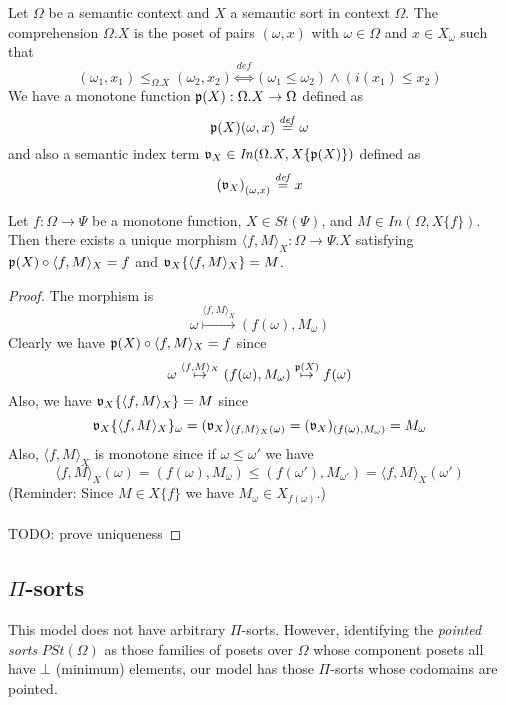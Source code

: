 \documentclass[sigplan,10pt,review,anonymous]{acmart}
\newcommand{\defeq}{\overset{\mathit{def}}{=}}
\newcommand{\defequiv}{\overset{\mathit{def}}{\Leftrightarrow}}
\newcommand{\fm}[2]{
\left(
\tiny
#1
\normalsize
\right)_{#2}
}
\begin{document}
Let $\Omega$ be a semantic context and $X$ a semantic sort in context $\Omega$. The comprehension $\Omega . X$ is the poset of pairs $(\omega,x)$ with $\omega \in \Omega$ and $x \in X_\omega$ such that 
$$(\omega_1,x_1) \leq_{\Omega.X} (\omega_2,x_2) \defequiv (\omega_1 \leq \omega_2) \wedge (i(x_1) \leq x_2)$$
We have a monotone function $\frak p(X) : \Omega . X \to \Omega$ defined as 
$$\frak p(X)(\omega,x) \defeq \omega$$
and also a semantic index term $\frak v_X \in \mathit{In}(\Omega.X, X \{ \frak p(X) \})$ defined as
$$\fm{\frak v_X}{ (\omega,x) } \defeq x$$
\begin{lemma}
Let $f : \Omega \to \Psi$ be a monotone function, $X \in \mathit{St}(\Psi)$, and $M \in \mathit{In}(\Omega, X \{ f \})$. Then there exists a unique morphism $\langle f, M \rangle_X : \Omega \to \Psi.X$ satisfying $\frak p(X) \circ \langle f, M \rangle_X = f$ and $\frak v_{X}\{ \langle f, M \rangle_X \} = M$.  
\end{lemma}

\begin{proof}
The morphism is
$$\omega \overset{\langle f, M \rangle_X}{\mapsto} (f(\omega), M_{\omega})$$
Clearly we have $\frak p(X) \circ \langle f, M \rangle_X = f$ since
$$\omega \overset{\langle f, M \rangle_X}{\mapsto} (f(\omega), M_{\omega}) \overset{\frak p(X)}{\mapsto} f(\omega)$$
Also, we have $\frak v_X \{ \langle f, M \rangle_X \} = M$ since
$$\frak v_X \{ \langle f, M \rangle_X \}_\omega = (\frak v_X)_{\langle f , M \rangle_X(\omega)} = (\frak v_X)_{(f(\omega), M_\omega)} = M_\omega$$
Also, $\langle f, M \rangle_X$ is monotone since if $\omega \leq \omega'$ we have
$$\langle f, M \rangle_X (\omega) = (f(\omega), M_\omega) \leq (f(\omega'), M_{\omega'}) = \langle f, M \rangle_X (\omega')$$
(Reminder: Since $M \in X \{ f \}$ we have $M_\omega \in X_{f(\omega)}$.)\\~\\
TODO: prove uniqueness
\end{proof}

\subsection{$\Pi$-sorts}

This model does not have arbitrary $\Pi$-sorts. However, identifying the \emph{pointed sorts} $\mathit{PSt}(\Omega)$ as those families of posets over $\Omega$ whose component posets all have $\bot$ (minimum) elements, our model has those $\Pi$-sorts whose codomains are pointed.  
\end{document}
